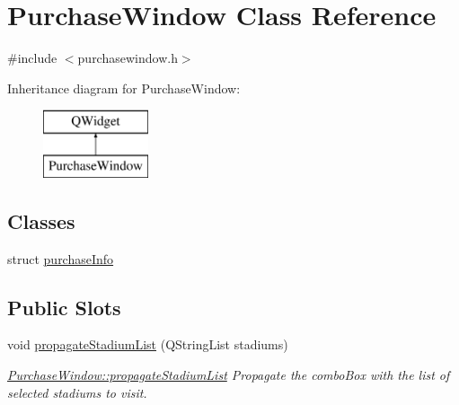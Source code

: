 \hypertarget{class_purchase_window}{}\section{Purchase\+Window Class Reference}
\label{class_purchase_window}


{\ttfamily \#include $<$purchasewindow.\+h$>$}

Inheritance diagram for Purchase\+Window\+:\begin{figure}[H]
\begin{center}
\leavevmode
\includegraphics[height=2.000000cm]{class_purchase_window}
\end{center}
\end{figure}
\subsection*{Classes}
\begin{DoxyCompactItemize}
\item 
struct \hyperlink{struct_purchase_window_1_1purchase_info}{purchase\+Info}
\end{DoxyCompactItemize}
\subsection*{Public Slots}
\begin{DoxyCompactItemize}
\item 
void \hyperlink{class_purchase_window_a6f1bfcc93c4cb61b56b1707671e13ba8}{propagate\+Stadium\+List} (Q\+String\+List stadiums)
\begin{DoxyCompactList}\small\item\em \hyperlink{class_purchase_window_a6f1bfcc93c4cb61b56b1707671e13ba8}{Purchase\+Window\+::propagate\+Stadium\+List} Propagate the combo\+Box with the list of selected stadiums to visit. \end{DoxyCompactList}\end{DoxyCompactItemize}
